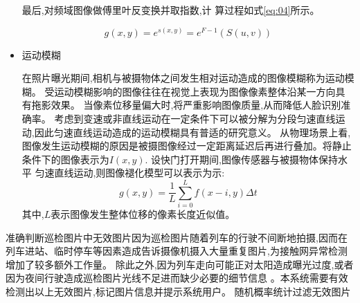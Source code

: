 \message{ !name(main.tex)}\documentclass{amsart}
\begin{document}
\begin{itemize}
  最后,对频域图像做傅里叶反变换并取指数,计
  算过程如式\ref{eq:04}所示。

  \begin{equation}
    \label{eq:04}
g(x, y)=e^{s(x, y)}=e^{F-1}(S(u, v))
  \end{equation}

\item 运动模糊

  在照片曝光期间,相机与被摄物体之间发生相对运动造成的图像模糊称为运动模糊。
  受运动模糊影响的图像往往在视觉上表现为图像像素整体沿某一方向具有拖影效果。
  当像素位移量偏大时,将严重影响图像质量,从而降低人脸识别准确率。
  考虑到变速或非直线运动在一定条件下可以被分解为分段匀速直线运动,因此匀速直线运动造成的运动模糊具有普适的研究意义。
  从物理场景上看,图像发生运动模糊的原因是被摄图像经过一定距离延迟后再进行叠加。将静止条件下的图像表示为$I(x,y)$.
  设快门打开期间,图像传感器与被摄物体保持水平
  匀速直线运动,则图像褪化模型可以表示为示:
  \begin{equation}
    \label{eq:05}
g(x, y)=\frac{1}{L} \sum_{i=0}^{L} f(x-i, y) \Delta t
  \end{equation}
  其中,$L$表示图像发生整体位移的像素长度近似值。
\end{itemize}


\cite{gaohuihuang}
准确判断巡检图片中无效图片因为巡检图片随着列车的行驶不间断地拍摄,因而在列车进站、临时停车等因素造成告诉摄像机摄入大量重复图片,为接触网异常检测增加了较多额外工作量。
除此之外,因为列车走向可能正对太阳造成曝光过度,或者因为夜间行驶造成巡检图片光线不足进而缺少必要的细节信息
。本系统需要有效检测出以上无效图片,标记图片信息并提示系统用户。
随机概率统计过滤无效图片
\end{document}
